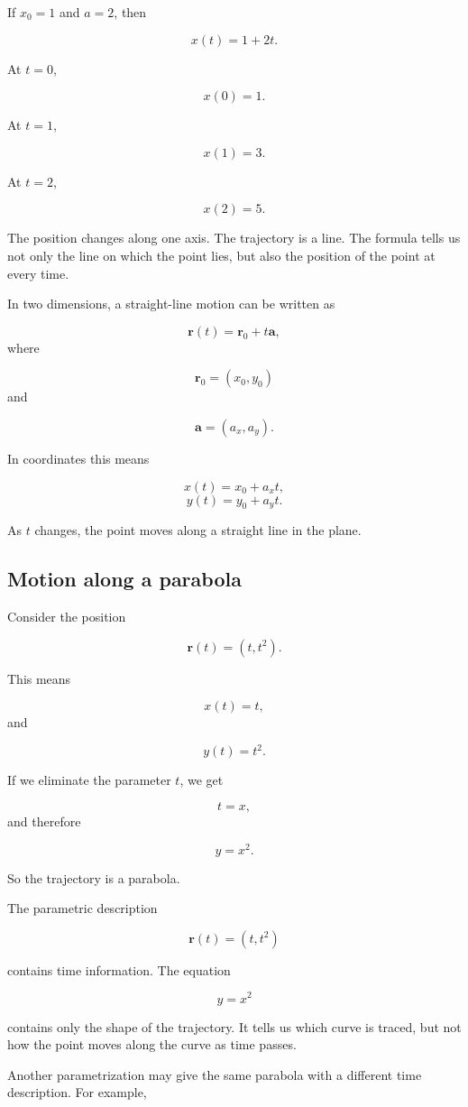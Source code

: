 If \(x_0=1\) and \(a=2\), then

\[
x(t) = 1+2t.
\]

At \(t=0\),

\[
x(0)=1.
\]

At \(t=1\),

\[
x(1)=3.
\]

At \(t=2\),

\[
x(2)=5.
\]

The position changes along one axis. The trajectory is a line. The formula tells us not only the line on which the point lies, but also the position of the point at every time.

In two dimensions, a straight-line motion can be written as

\[
\mathbf{r}(t) = \mathbf{r}_0 + t\mathbf{a},
\]
where

\[
\mathbf{r}_0 = (x_0,y_0)
\]
and

\[
\mathbf{a} = (a_x,a_y).
\]

In coordinates this means

\[
x(t)=x_0+a_xt,
\]
\[
y(t)=y_0+a_yt.
\]

As \(t\) changes, the point moves along a straight line in the plane.

\subsection{Motion along a parabola}

Consider the position

\[
\mathbf{r}(t) = (t,t^2).
\]

This means

\[
x(t)=t,
\]
and

\[
y(t)=t^2.
\]

If we eliminate the parameter \(t\), we get

\[
t=x,
\]
and therefore

\[
y=x^2.
\]

So the trajectory is a parabola.

The parametric description

\[
\mathbf{r}(t)=(t,t^2)
\]

contains time information. The equation

\[
y=x^2
\]

contains only the shape of the trajectory. It tells us which curve is traced, but not how the point moves along the curve as time passes.

Another parametrization may give the same parabola with a different time description. For example,

